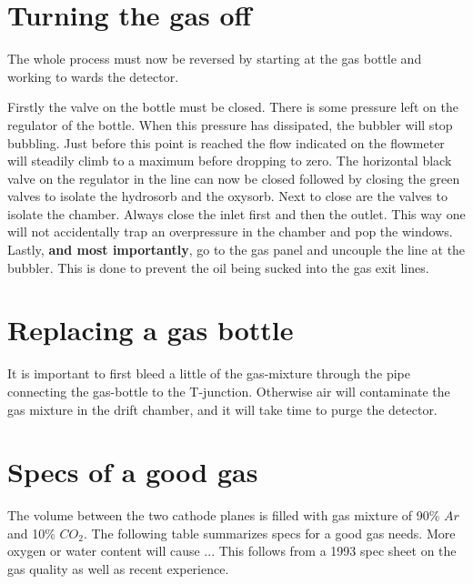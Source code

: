 \documentclass[11pt]{report}
\begin{document}
\section{Turning the gas off}

The whole process must now be reversed by starting at the gas bottle 
and working to wards the detector.

Firstly the valve on the bottle must be closed. There is some pressure 
left on the regulator of the bottle. When this pressure has dissipated,
the bubbler will stop bubbling. Just before this point is reached the 
flow indicated on the flowmeter will steadily climb to a maximum before
dropping to zero. The horizontal black valve on the regulator in the 
line can now be closed followed by closing the green valves to isolate
the hydrosorb and the oxysorb. Next to close are the valves to isolate 
the chamber. Always close the inlet first and then the outlet. This way 
one will not accidentally trap an overpressure in the chamber and pop
the windows. Lastly, {\bf and most importantly},
go to the gas panel and uncouple the line at the 
bubbler. This is done to prevent the oil being  sucked into the gas exit  
lines.

\section{Replacing a gas bottle}

It is important to first bleed a little of the gas-mixture through
the pipe connecting the gas-bottle to the T-junction.
Otherwise air will contaminate the gas mixture in the drift chamber, and 
it will take time to purge the detector.


\section{Specs of a good gas}

The volume between the two cathode planes is
filled with gas mixture of 90\% $Ar$ and 10\% $CO_{2}$.
The following table summarizes specs for a good gas needs. More oxygen or
water content will cause ...
This follows from a 1993 spec sheet on the gas quality as well as recent
experience.

\end{document}
